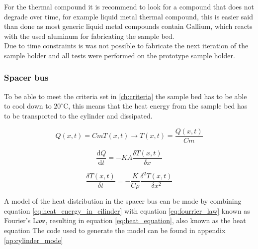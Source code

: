 \documentclass[10pt]{article}
\begin{document}
For the thermal compound it is recommend to look for a compound that does not degrade over time, for example liquid metal thermal compound, this is easier said than done as most generic liquid metal compounds contain Gallium, which reacts with the used aluminum for fabricating the sample bed.\\

Due to time constraints is was not possible to fabricate the next iteration of the sample holder and all tests were performed on the prototype sample holder.\\


\subsubsection{Spacer bus}

To be able to meet the criteria set in \ref{ch:criteria} the sample bed has to be able to cool down to $20^\circ$C, this means that the heat energy from the sample bed has to be transported to the cylinder and dissipated.



\begin{equation}
  Q(x,t) = CmT(x, t) \rightarrow T(x,t) = \frac{Q(x, t)}{Cm}
  \label{eq:heat_energy_in_cilinder}
\end{equation}

\begin{equation}
  \frac{\mathrm{d}Q}{\mathrm{d}t} = -KA\frac{\delta T(x, t)}{\delta {x}}
  \label{eq:fourrier_law}
\end{equation}

\begin{equation}
  \frac{\delta{T(x,t)}}{\delta t} = -\frac{K}{C\rho}\frac{\delta^{2} T(x, t)}{\delta x^2}
  \label{eq:heat_equation}
\end{equation}

A model of the heat distribution in the spacer bus can be made by combining equation \ref{eq:heat_energy_in_cilinder} with equation \ref{eq:fourrier_law} known as Fourier's Law, resulting in equation \ref{eq:heat_equation}, also known as the heat equation 
The code used to generate the model can be found in appendix \ref{ap:cylinder_mode}
\end{document}

